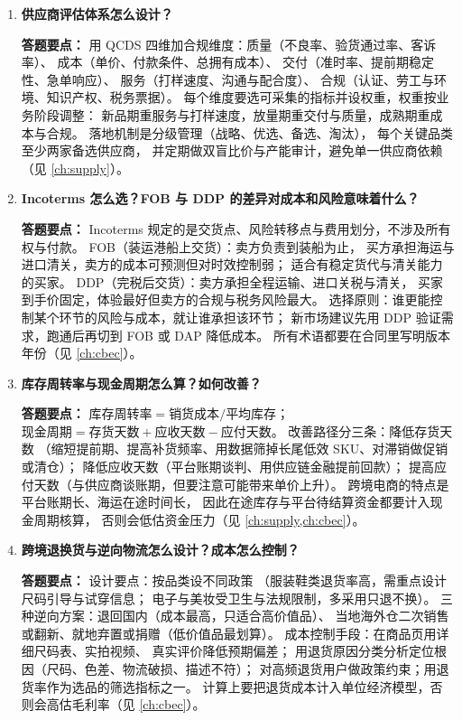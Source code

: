 \begin{interview}[题库与答题要点]
\begin{enumerate}[label=]
  \item[\textcolor{VioletDeep}{\textbf{Q105.}}] \textbf{供应商评估体系怎么设计？}
\par\smallskip\noindent\textcolor{VioletDeep}{\textbf{答题要点：}}
用 QCDS 四维加合规维度：质量（不良率、验货通过率、客诉率）、
成本（单价、付款条件、总拥有成本）、
交付（准时率、提前期稳定性、急单响应）、
服务（打样速度、沟通与配合度）、
合规（认证、劳工与环境、知识产权、税务票据）。
每个维度要选可采集的指标并设权重，权重按业务阶段调整：
新品期重服务与打样速度，放量期重交付与质量，成熟期重成本与合规。
落地机制是分级管理（战略、优选、备选、淘汰），
每个关键品类至少两家备选供应商，
并定期做双盲比价与产能审计，避免单一供应商依赖（见 \cref{ch:supply}）。

  \item[\textcolor{VioletDeep}{\textbf{Q106.}}] \textbf{Incoterms 怎么选？FOB 与 DDP 的差异对成本和风险意味着什么？}
\par\smallskip\noindent\textcolor{VioletDeep}{\textbf{答题要点：}}
Incoterms 规定的是交货点、风险转移点与费用划分，不涉及所有权与付款。
FOB（装运港船上交货）：卖方负责到装船为止，
买方承担海运与进口清关，卖方的成本可预测但对时效控制弱；
适合有稳定货代与清关能力的买家。
DDP（完税后交货）：卖方承担全程运输、进口关税与清关，
买家到手价固定，体验最好但卖方的合规与税务风险最大。
选择原则：谁更能控制某个环节的风险与成本，就让谁承担该环节；
新市场建议先用 DDP 验证需求，跑通后再切到 FOB 或 DAP 降低成本。
所有术语都要在合同里写明版本年份（见 \cref{ch:cbec}）。

  \item[\textcolor{VioletDeep}{\textbf{Q107.}}] \textbf{库存周转率与现金周期怎么算？如何改善？}
\par\smallskip\noindent\textcolor{VioletDeep}{\textbf{答题要点：}}
$\text{库存周转率} = \text{销货成本} / \text{平均库存}$；
$\text{现金周期} = \text{存货天数} + \text{应收天数} - \text{应付天数}$。
改善路径分三条：降低存货天数
（缩短提前期、提高补货频率、用数据筛掉长尾低效 SKU、对滞销做促销或清仓）；
降低应收天数（平台账期谈判、用供应链金融提前回款）；
提高应付天数（与供应商谈账期，但要注意可能带来单价上升）。
跨境电商的特点是平台账期长、海运在途时间长，
因此在途库存与平台待结算资金都要计入现金周期核算，
否则会低估资金压力（见 \cref{ch:supply,ch:cbec}）。

  \item[\textcolor{VioletDeep}{\textbf{Q108.}}] \textbf{跨境退换货与逆向物流怎么设计？成本怎么控制？}
\par\smallskip\noindent\textcolor{VioletDeep}{\textbf{答题要点：}}
设计要点：按品类设不同政策
（服装鞋类退货率高，需重点设计尺码引导与试穿信息；
电子与美妆受卫生与法规限制，多采用只退不换）。
三种逆向方案：退回国内（成本最高，只适合高价值品）、
当地海外仓二次销售或翻新、就地弃置或捐赠（低价值品最划算）。
成本控制手段：在商品页用详细尺码表、实拍视频、
真实评价降低预期偏差；
用退货原因分类分析定位根因（尺码、色差、物流破损、描述不符）；
对高频退货用户做政策约束；用退货率作为选品的筛选指标之一。
计算上要把退货成本计入单位经济模型，否则会高估毛利率（见 \cref{ch:cbec}）。


\end{enumerate}
\end{interview}
